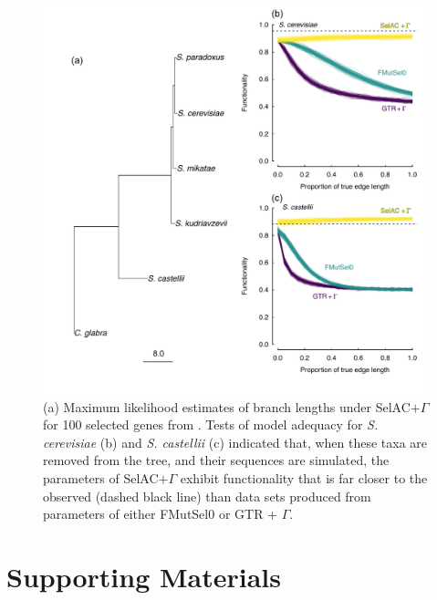 \documentclass[12pt,letterpaper]{article}
\newcommand{\selacplusgamma}{SelAC$+\Gamma$\xspace}
\begin{document}
\begin{figure}[H]
  \centering
  \includegraphics[width=0.9\linewidth]{FIGURE_3_Inferred_Tree_AND_Model_Adequacy.pdf}
  \caption{(a) Maximum likelihood estimates of branch lengths under \selacplusgamma for 100 selected genes from \citet{SalichosAndRokas2013}.
    Tests of model adequacy for \emph{S. cerevisiae} (b) and \emph{S. castellii} (c) indicated that, when these taxa are removed from the tree, and their sequences are simulated, the parameters of \selacplusgamma exhibit functionality that is far closer to the observed (dashed black line) than data sets produced from parameters of either FMutSel0 or GTR + $\Gamma$.
}
  \label{fig:TreeAndAdequacy}
\end{figure}


\clearpage

\setcounter{figure}{0}
\setcounter{table}{0}
\setcounter{page}{1}
\setcounter{section}{0}

\renewcommand{\thefigure}{S\arabic{figure}}
\renewcommand{\thetable}{S\arabic{table}}
\renewcommand{\thepage}{S\arabic{page}}
\renewcommand{\thesection}{\arabic{section}} %
\renewcommand{\appendixname}{Supporting Materials}
\renewcommand{\theequation}{S\arabic{equation}}

\setcounter{equation}{0}
\appendix
\part{\appendixname}
\end{document}
